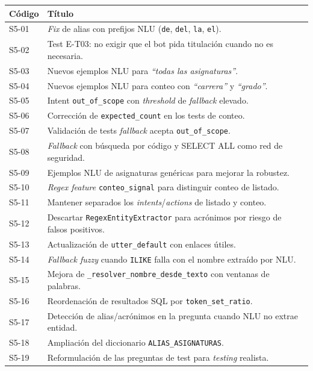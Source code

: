 \begin{longtable}{|p{1.3cm}|>{\raggedright\arraybackslash}p{12cm}|}
\hline
\textbf{Código} & \textbf{Título} \\ \hline
S5-01 & \textit{Fix} de alias con prefijos NLU (\texttt{de}, \texttt{del}, \texttt{la}, \texttt{el}). \\ \hline
S5-02 & Test E-T03: no exigir que el bot pida titulación cuando no es necesaria. \\ \hline
S5-03 & Nuevos ejemplos NLU para \textit{``todas las asignaturas''}. \\ \hline
S5-04 & Nuevos ejemplos NLU para conteo con \textit{``carrera''} y \textit{``grado''}. \\ \hline
S5-05 & Intent \texttt{out\_of\_scope} con \textit{threshold} de \textit{fallback} elevado. \\ \hline
S5-06 & Corrección de \texttt{expected\_count} en los tests de conteo. \\ \hline
S5-07 & Validación de tests \textit{fallback} acepta \texttt{out\_of\_scope}. \\ \hline
S5-08 & \textit{Fallback} con búsqueda por código y SELECT ALL como red de seguridad. \\ \hline
S5-09 & Ejemplos NLU de asignaturas genéricas para mejorar la robustez. \\ \hline
S5-10 & \textit{Regex feature} \texttt{conteo\_signal} para distinguir conteo de listado. \\ \hline
S5-11 & Mantener separados los \textit{intents}/\textit{actions} de listado y conteo. \\ \hline
S5-12 & Descartar \texttt{RegexEntityExtractor} para acrónimos por riesgo de falsos positivos. \\ \hline
S5-13 & Actualización de \texttt{utter\_default} con enlaces útiles. \\ \hline
S5-14 & \textit{Fallback fuzzy} cuando \texttt{ILIKE} falla con el nombre extraído por NLU. \\ \hline
S5-15 & Mejora de \texttt{\_resolver\_nombre\_desde\_texto} con ventanas de palabras. \\ \hline
S5-16 & Reordenación de resultados SQL por \texttt{token\_set\_ratio}. \\ \hline
S5-17 & Detección de alias/acrónimos en la pregunta cuando NLU no extrae entidad. \\ \hline
S5-18 & Ampliación del diccionario \texttt{ALIAS\_ASIGNATURAS}. \\ \hline
S5-19 & Reformulación de las preguntas de test para \textit{testing} realista. \\ \hline
\end{longtable}

